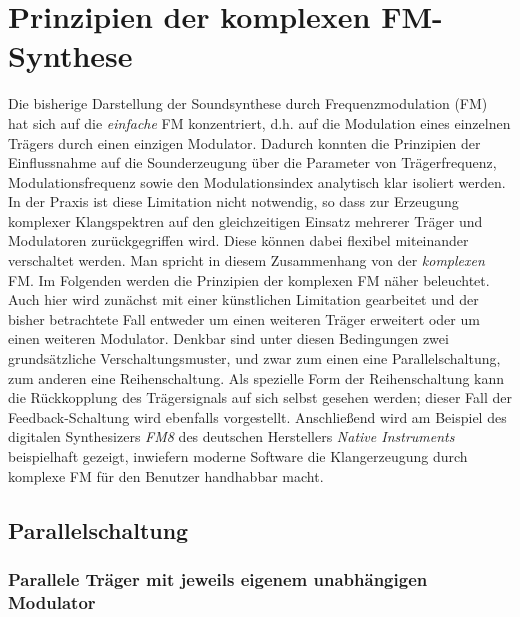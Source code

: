 \section{Prinzipien der komplexen FM-Synthese}
\label{PrinzipKomplexFM}

Die bisherige Darstellung der Soundsynthese durch Frequenzmodulation (FM) hat sich auf die \textit{einfache} FM konzentriert, d.h. auf die Modulation eines einzelnen Trägers durch einen einzigen Modulator. Dadurch konnten die Prinzipien der Einflussnahme auf die Sounderzeugung über die Parameter von Trägerfrequenz, Modulationsfrequenz sowie den Modulationsindex analytisch klar isoliert werden. In der Praxis ist diese Limitation nicht notwendig, so dass zur Erzeugung komplexer Klangspektren auf den gleichzeitigen Einsatz mehrerer Träger und Modulatoren zurückgegriffen wird. Diese können dabei flexibel miteinander verschaltet werden. Man spricht in diesem Zusammenhang von der \textit{komplexen} FM. Im Folgenden werden die Prinzipien der komplexen FM näher beleuchtet. Auch hier wird zunächst mit einer künstlichen Limitation gearbeitet und der bisher betrachtete Fall entweder um einen weiteren Träger erweitert oder um einen weiteren Modulator. Denkbar sind unter diesen Bedingungen zwei grundsätzliche Verschaltungsmuster, und zwar zum einen eine Parallelschaltung, zum anderen eine Reihenschaltung. Als spezielle Form der Reihenschaltung kann die Rückkopplung des Trägersignals auf sich selbst gesehen werden; dieser Fall der Feedback-Schaltung wird ebenfalls vorgestellt. Anschließend wird am Beispiel des digitalen Synthesizers \textit{FM8} des deutschen Herstellers \textit{Native Instruments} beispielhaft gezeigt, inwiefern moderne Software die Klangerzeugung durch komplexe FM für den Benutzer handhabbar macht. 

\subsection{Parallelschaltung}

\subsubsection{Parallele Träger mit jeweils eigenem unabhängigen Modulator}

